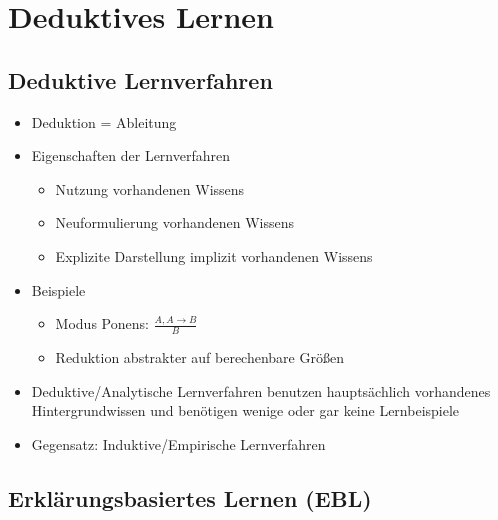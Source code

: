 \documentclass[paper=a4, fontsize=11pt]{scrartcl} %
\numberwithin{equation}{section} %
\numberwithin{figure}{section} %
\numberwithin{table}{section} %
\begin{document}
\section{Deduktives Lernen}

\subsection{Deduktive Lernverfahren}

\begin{itemize}
\item Deduktion = Ableitung
\item Eigenschaften der Lernverfahren
\begin{itemize}
\item Nutzung vorhandenen Wissens
\item Neuformulierung vorhandenen Wissens
\item Explizite Darstellung implizit vorhandenen Wissens
\end{itemize}
\item Beispiele
\begin{itemize}
\item Modus Ponens: $\frac{A, A \rightarrow B}{B}$
\item Reduktion abstrakter auf berechenbare Größen
\end{itemize}
\item Deduktive/Analytische Lernverfahren benutzen hauptsächlich vorhandenes Hintergrundwissen und benötigen wenige oder gar keine Lernbeispiele
\item Gegensatz: Induktive/Empirische Lernverfahren
\end{itemize}

\subsection{Erklärungsbasiertes Lernen (EBL)}
\end{document}
